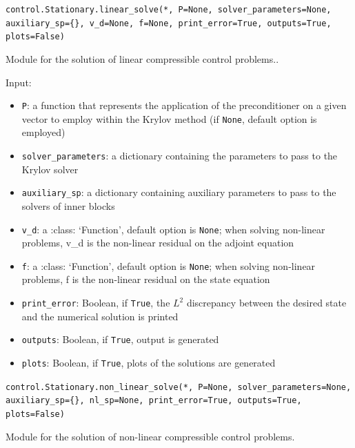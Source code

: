 \documentclass[letterpaper,10pt,english]{sphinxmanual}
\begin{document}
\texttt{control.Stationary.linear{\_}solve(*, P=None, solver{\_}parameters=None, auxiliary{\_}sp=\{\}, v{\_}d=None, f=None, print{\_}error=True, outputs=True, plots=False)}

Module for the solution of linear compressible control problems..

Input:
\begin{itemize}
\item \texttt{P}: a function that represents the application of the
            preconditioner on a given vector to employ within the Krylov
            method (if \texttt{None}, default option is employed)

\item \texttt{solver{\_}parameters}: a dictionary containing the parameters to pass
            to the Krylov solver

\item \texttt{auxiliary{\_}sp}: a dictionary containing auxiliary parameters to
            pass to the solvers of inner blocks

\item \texttt{v{\_}d}: a :class: `Function', default option is \texttt{None}; when solving
            non-linear problems, v\_d is the non-linear residual on the adjoint
            equation

\item \texttt{f}:  a :class: `Function', default option is \texttt{None}; when solving
            non-linear problems, f is the non-linear residual on the state
            equation

\item \texttt{print{\_}error}: Boolean, if \texttt{True}, the $L^2$ discrepancy between the
            desired state and the numerical solution is printed

\item \texttt{outputs}: Boolean, if \texttt{True}, output is generated

\item \texttt{plots}: Boolean, if \texttt{True}, plots of the solutions are generated
\end{itemize}

\vspace{3ex}

\texttt{control.Stationary.non{\_}linear{\_}solve(*, P=None, solver{\_}parameters=None, auxiliary{\_}sp=\{\}, nl{\_}sp=None, print{\_}error=True, outputs=True, plots=False)}

Module for the solution of non-linear compressible control problems.
\end{document}
